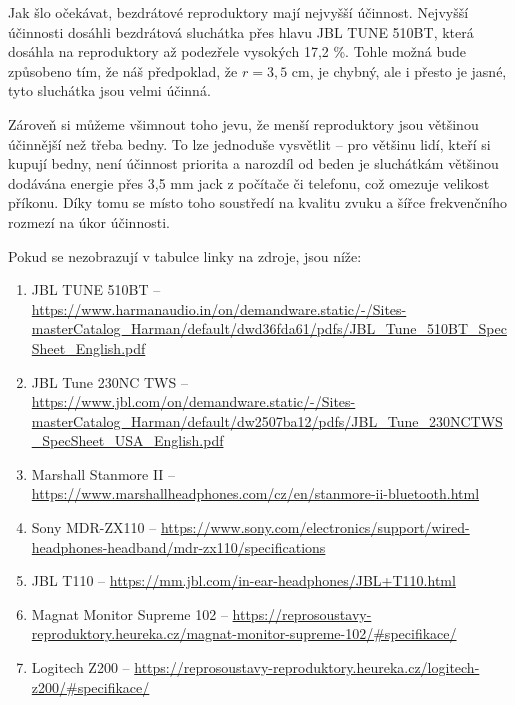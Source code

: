 \documentclass{fkssolpub}
\begin{document}
Jak šlo očekávat, bezdrátové reproduktory mají nejvyšší účinnost. Nejvyšší účinnosti
dosáhli bezdrátová sluchátka přes hlavu JBL TUNE 510BT, která dosáhla na
reproduktory až podezřele vysokých 17,2 \%. Tohle možná bude způsobeno tím,
že náš předpoklad, že $r = 3,5$ cm, je chybný, ale i přesto je jasné,
tyto sluchátka jsou velmi účinná.

Zároveň si můžeme všimnout toho jevu, že menší reproduktory jsou většinou 
účinnější než třeba bedny. To lze jednoduše vysvětlit -- pro většinu lidí,
kteří si kupují bedny, není účinnost priorita a narozdíl od beden je sluchátkám 
většinou dodávána energie přes 3,5 mm jack z počítače či telefonu, což 
omezuje velikost příkonu. Díky tomu se místo toho soustředí na kvalitu zvuku 
a šířce frekvenčního rozmezí na úkor účinnosti. 

Pokud se nezobrazují v tabulce linky na zdroje, jsou níže:

\begin{enumerate}
 \item JBL TUNE 510BT -- \url{https://www.harmanaudio.in/on/demandware.static/-/Sites-masterCatalog_Harman/default/dwd36fda61/pdfs/JBL_Tune_510BT_SpecSheet_English.pdf} 
 \item JBL Tune 230NC TWS -- \url{https://www.jbl.com/on/demandware.static/-/Sites-masterCatalog_Harman/default/dw2507ba12/pdfs/JBL_Tune_230NCTWS_SpecSheet_USA_English.pdf} 
 \item Marshall Stanmore II -- \url{https://www.marshallheadphones.com/cz/en/stanmore-ii-bluetooth.html} 
 \item Sony MDR-ZX110 -- \url{https://www.sony.com/electronics/support/wired-headphones-headband/mdr-zx110/specifications} 
 \item JBL T110 -- \url{https://mm.jbl.com/in-ear-headphones/JBL+T110.html}  
 \item Magnat Monitor Supreme 102 -- \url{https://reprosoustavy-reproduktory.heureka.cz/magnat-monitor-supreme-102/#specifikace/} 
 \item Logitech Z200 -- \url{https://reprosoustavy-reproduktory.heureka.cz/logitech-z200/#specifikace/} 
\end{enumerate}
\end{document}
